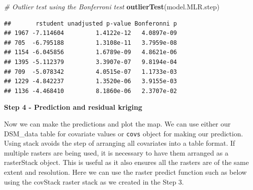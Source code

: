 \documentclass[10pt,b5paper,]{book}
\newenvironment{Shaded}{\begin{snugshade}}{\end{snugshade}}
\newcommand{\CommentTok}[1]{\textcolor[rgb]{0.56,0.35,0.01}{\textit{#1}}}
\newcommand{\DataTypeTok}[1]{\textcolor[rgb]{0.13,0.29,0.53}{#1}}
\newcommand{\KeywordTok}[1]{\textcolor[rgb]{0.13,0.29,0.53}{\textbf{#1}}}
\newcommand{\NormalTok}[1]{#1}
\newcommand{\OperatorTok}[1]{\textcolor[rgb]{0.81,0.36,0.00}{\textbf{#1}}}
\newcommand{\StringTok}[1]{\textcolor[rgb]{0.31,0.60,0.02}{#1}}
\theoremstyle{definition}
\theoremstyle{definition}
\theoremstyle{definition}
\theoremstyle{remark}
\begin{document}
\begin{Shaded}
\begin{Highlighting}[]
\CommentTok{# Outlier test using the Bonferroni test}
\KeywordTok{outlierTest}\NormalTok{(model.MLR.step)}
\end{Highlighting}
\end{Shaded}

\begin{verbatim}
##       rstudent unadjusted p-value Bonferonni p
## 1967 -7.114604         1.4122e-12   4.0897e-09
## 705  -6.795188         1.3108e-11   3.7959e-08
## 1154 -6.045856         1.6789e-09   4.8621e-06
## 1395 -5.112379         3.3907e-07   9.8194e-04
## 709  -5.078342         4.0515e-07   1.1733e-03
## 1229 -4.842237         1.3520e-06   3.9155e-03
## 1136 -4.468410         8.1860e-06   2.3707e-02
\end{verbatim}

\textbf{Step 4 - Prediction and residual kriging}

Now we can make the predictions and plot the map. We can use either our
DSM\_data table for covariate values or \texttt{covs} object for making
our prediction. Using stack avoids the step of arranging all covariates
into a table format. If multiple rasters are being used, it is necessary
to have them arranged as a rasterStack object. This is useful as it also
ensures all the rasters are of the same extent and resolution. Here we
can use the raster predict function such as below using the covStack
raster stack as we created in the Step 3.

\begin{Shaded}
\end{Shaded}
\end{document}
